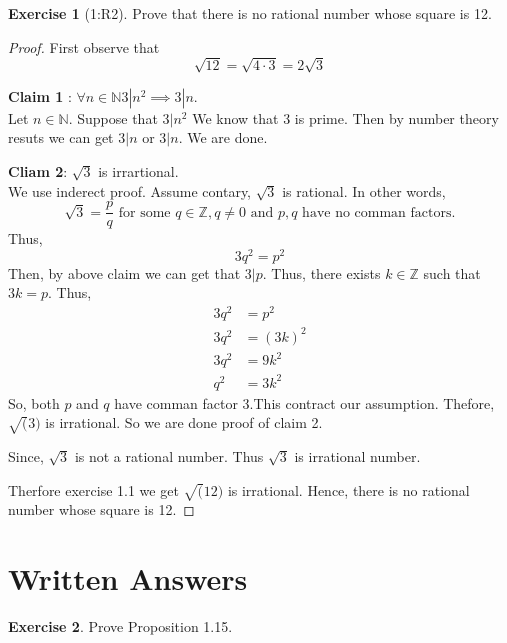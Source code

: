 \documentclass[
]{book}
\theoremstyle{definition}
\theoremstyle{definition}
\theoremstyle{definition}
\newtheorem{exercise}{Exercise}[chapter]
\theoremstyle{definition}
\theoremstyle{remark}
\begin{document}
\begin{exercise}[1:R2]
\protect\hypertarget{exr:unnamed-chunk-2}{}\label{exr:unnamed-chunk-2}Prove that there is no rational number whose square is 12.
\end{exercise}

\begin{proof}
First observe that
\[\sqrt{12}=\sqrt{4\cdot 3}=2\sqrt{3}\]

\textbf{Claim 1} : \(\forall n\in \mathbb{N}3|n^2 \implies 3|n\).\\
Let \(n\in \mathbb{N}\). Suppose that \(3|n^2\) We know that \(3\) is prime. Then by number theory resuts we can get \(3|n\) or \(3|n\).
We are done.

\textbf{Cliam 2}: \(\sqrt{3}\) is irrartional.\\
We use inderect proof. Assume contary, \(\sqrt{3}\) is rational. In other words,
\[\sqrt{3}=\frac{p}{q}\text{  for some } q\in \mathbb{Z} , q\neq 0\text{ and } p,q \text{ have no comman factors.}\]
Thus,\[3q^2=p^2\]
Then, by above claim we can get that \(3|p\). Thus, there exists \(k \in \mathbb{Z}\) such that \(3k=p\).
Thus,
\[
\begin{aligned}
3q^2 &=p^2\\
3q^2 &= (3k)^2\\
3q^2 &= 9k^2\\
q^2  &= 3k^2
\end{aligned}
\]
So, both \(p\) and \(q\) have comman factor 3.This contract our assumption. Thefore, \(\sqrt(3)\) is irrational. So we are done proof of claim 2.

Since, \(\sqrt{3}\) is not a rational number. Thus \(\sqrt{3}\) is irrational number.

Therfore exercise 1.1 we get \(\sqrt(12)\) is irrational. Hence, there is no rational number whose square is 12.
\end{proof}

\section{Written Answers}\label{written-answers}

\begin{exercise}
\protect\hypertarget{exr:unnamed-chunk-4}{}\label{exr:unnamed-chunk-4}Prove Proposition 1.15.
\end{exercise}
\end{document}
